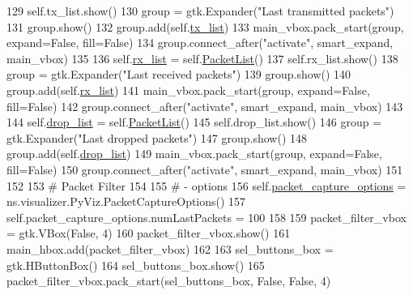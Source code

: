 \begin{DoxyCode}
{129         self.tx\_list.show()
130         group = gtk.Expander(\textcolor{stringliteral}{"Last transmitted packets"})
131         group.show()
132         group.add(self.\hyperlink{classshow__last__packets_1_1ShowLastPackets_a20a0ef63b8cf999d312e67d61782bced}{tx\_list})
133         main\_vbox.pack\_start(group, expand=\textcolor{keyword}{False}, fill=\textcolor{keyword}{False})
134         group.connect\_after(\textcolor{stringliteral}{"activate"}, smart\_expand, main\_vbox)
135 
136         self.\hyperlink{classshow__last__packets_1_1ShowLastPackets_ad92d52823bdcd5748306be45682dc7e3}{rx\_list} = self.\hyperlink{classshow__last__packets_1_1ShowLastPackets_1_1PacketList}{PacketList}()
137         self.rx\_list.show()
138         group = gtk.Expander(\textcolor{stringliteral}{"Last received packets"})
139         group.show()
140         group.add(self.\hyperlink{classshow__last__packets_1_1ShowLastPackets_ad92d52823bdcd5748306be45682dc7e3}{rx\_list})
141         main\_vbox.pack\_start(group, expand=\textcolor{keyword}{False}, fill=\textcolor{keyword}{False})
142         group.connect\_after(\textcolor{stringliteral}{"activate"}, smart\_expand, main\_vbox)
143 
144         self.\hyperlink{classshow__last__packets_1_1ShowLastPackets_acb325aab75d37f20a4de80dc39f6ea11}{drop\_list} = self.\hyperlink{classshow__last__packets_1_1ShowLastPackets_1_1PacketList}{PacketList}()
145         self.drop\_list.show()
146         group = gtk.Expander(\textcolor{stringliteral}{"Last dropped packets"})
147         group.show()
148         group.add(self.\hyperlink{classshow__last__packets_1_1ShowLastPackets_acb325aab75d37f20a4de80dc39f6ea11}{drop\_list})
149         main\_vbox.pack\_start(group, expand=\textcolor{keyword}{False}, fill=\textcolor{keyword}{False})
150         group.connect\_after(\textcolor{stringliteral}{"activate"}, smart\_expand, main\_vbox)
151 
152 
153         \textcolor{comment}{# Packet Filter}
154 
155         \textcolor{comment}{# - options}
156         self.\hyperlink{classshow__last__packets_1_1ShowLastPackets_a66331507375ad09ebb8ffae3450ec38c}{packet\_capture\_options} = ns.visualizer.PyViz.PacketCaptureOptions()
157         self.packet\_capture\_options.numLastPackets = 100
158 
159         packet\_filter\_vbox = gtk.VBox(\textcolor{keyword}{False}, 4)
160         packet\_filter\_vbox.show()
161         main\_hbox.add(packet\_filter\_vbox)
162 
163         sel\_buttons\_box = gtk.HButtonBox()
164         sel\_buttons\_box.show()
165         packet\_filter\_vbox.pack\_start(sel\_buttons\_box, \textcolor{keyword}{False}, \textcolor{keyword}{False}, 4)
}
\end{DoxyCode}
